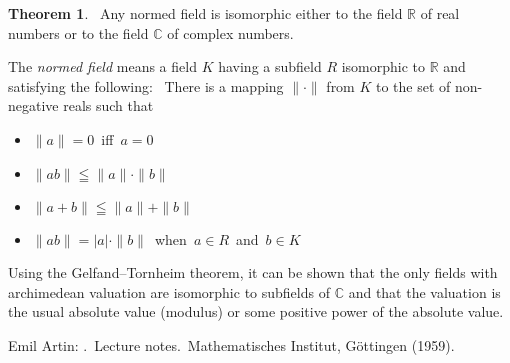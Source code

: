 \documentclass[12pt]{article}
\theoremstyle{definition}
\newtheorem*{thmplain}{Theorem}
\begin{document}
\begin{thmplain}
\, Any normed field is isomorphic either to the field $\mathbb{R}$ of real numbers or to the field $\mathbb{C}$ of complex numbers.
\end{thmplain}

The {\em normed field} means a field $K$ having a subfield $R$ isomorphic to $\mathbb{R}$ and satisfying the following: \,
There is a mapping $\|\cdot\|$ from $K$ to the set of non-negative reals such that
\begin{itemize}
 \item $\|a\| = 0$\, iff\, $a = 0$
 \item $\|ab\| \leqq \|a\|\cdot\|b\|$
 \item $\|a+b\| \leqq \|a\|+\|b\|$
 \item $\|ab\| = |a|\cdot\|b\|$\, when\, $a \in R$\, and\, $b \in K$
\end{itemize}

Using the Gelfand--Tornheim theorem, it can be shown that the only fields with archimedean valuation are isomorphic to subfields of $\mathbb{C}$ and that the valuation is the usual absolute value (modulus) or some positive power of the absolute value.

\begin{thebibliography}{8}
Emil Artin: {\em {}}. \,Lecture notes. \,Mathematisches Institut, G\"ottingen (1959).
\end{thebibliography}
\end{document}
